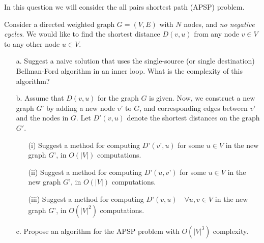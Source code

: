 In this question we will consider the all pairs shortest path (APSP) problem.

Consider a directed weighted graph $G = (V,E)$  with $N$ nodes, and \emph{no negative cycles}. We would like to find the shortest distance $D(v,u)$ from any node $v \in V$ to any other node $u \in V$.

\begin{itemize}
    \item[a.] Suggest a naive solution that uses the single-source (or single destination) Bellman-Ford algorithm in an inner loop. What is the complexity of this algorithm?
    \item[b.] Assume that $D(v,u)$ for the graph $G$ is given. Now, we construct a new graph $G’$ by adding a new node $v’$ to $G$, and corresponding edges between $v’$ and the nodes in $G$. Let $D'(v,u)$ denote the shortest distances on the graph $G'$.
    \begin{itemize}
        \item[(i)] Suggest a method for computing $D’(v’, u)$ for some $u \in V$ in the new graph $G’$, in $O(|V|)$ computations.
        \item[(ii)] Suggest a method for computing $D’(u, v’)$ for some $u \in V$ in the new graph $G’$, in $O(|V|)$ computations.
        \item[(iii)] Suggest a method for computing $D’(v, u) \quad \forall u,v \in V$ in the new graph $G’$, in $O(|V|^2)$ computations.
    \end{itemize}
    \item[c.] Propose an algorithm for the APSP problem with $O(|V|^3)$ complexity.
\end{itemize}